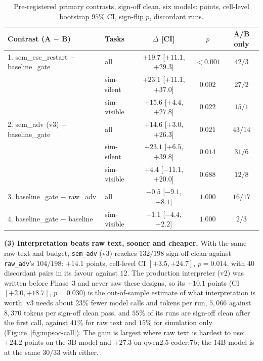 \documentclass[11pt]{article}
\begin{document}
\begin{table}[!htbp]
\centering
\caption{Pre-registered primary contrasts, sign-off clean, six models: points,
cell-level bootstrap $95\%$ CI, sign-flip $p$, discordant runs.}
\label{tab:mpsoc-primary}
\small
\begin{tabular}{@{}l l c c c@{}}
\toprule
\textbf{Contrast (A $-$ B)} & \textbf{Tasks} & \textbf{$\Delta$ [CI]} & \textbf{$p$} & \textbf{A/B only} \\
\midrule
1. sem\_esc\_restart $-$ baseline\_gate & all         & $\mathbf{+19.7}$ [$+11.1$, $+29.3$] & ${<}0.001$ & $42/3$ \\
                                        & sim-silent  & $+23.1$ [$+11.1$, $+37.0$] & $0.002$ & $27/2$ \\
                                        & sim-visible & $+15.6$ [$+4.4$, $+27.8$]  & $0.022$ & $15/1$ \\
2. sem\_adv (v3) $-$ baseline\_gate     & all         & $\mathbf{+14.6}$ [$+3.0$, $+26.3$] & $0.021$ & $43/14$ \\
                                        & sim-silent  & $+23.1$ [$+6.5$, $+39.8$]  & $0.014$ & $31/6$ \\
                                        & sim-visible & $+4.4$ [$-11.1$, $+20.0$]  & $0.688$ & $12/8$ \\
3. baseline\_gate $-$ raw\_adv          & all         & $-0.5$ [$-9.1$, $+8.1$]    & $1.000$ & $16/17$ \\
4. baseline\_gate $-$ baseline          & sim-visible & $-1.1$ [$-4.4$, $+2.2$]    & $1.000$ & $2/3$ \\
\bottomrule
\end{tabular}
\end{table}

\textbf{(3) Interpretation beats raw text, sooner and cheaper.} With the same
raw text and budget, \texttt{sem\_adv} (v3) reaches $132/198$ sign-off clean
against \texttt{raw\_adv}'s $104/198$: $+14.1$ points, cell-level CI $[+3.5,
+24.7]$, $p=0.014$, with $40$ discordant pairs in its favour against $12$. The
production interpreter (v2) was written before Phase~3 and never saw these
designs, so its $+10.1$ points (CI $[+2.0, +18.7]$, $p=0.030$) is the
out-of-sample estimate of what interpretation is worth. v3 needs about $23\%$
fewer model calls and tokens per run, $5{,}066$ against $8{,}370$ tokens per
sign-off clean pass, and $55\%$ of its runs are sign-off clean after the first
call, against $41\%$ for raw text and $15\%$ for simulation only
(Figure~\ref{fig:mpsoc-call}). The gain is largest where raw text is hardest to
use: $+24.2$ points on the $3$B model and $+27.3$ on qwen2.5-coder:7b; the
$14$B model is at the same $30/33$ with either.
\end{document}
